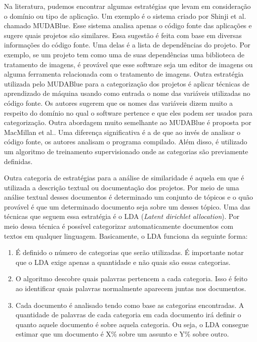 Na literatura, pudemos encontrar algumas estratégias que levam em consideração o domínio ou tipo de aplicação. Um exemplo é o sistema criado por Shinji et al. chamado MUDABlue\cite{kawaguchi2006mudablue}. Esse sistema analisa apenas o código fonte das aplicações e sugere quais projetos são similares. Essa sugestão é feita com base em diversas informações do código fonte. Uma delas é a lista de dependências do projeto. Por exemplo, se um projeto tem como uma de suas dependências uma biblioteca de tratamento de imagens, é provável que esse software seja um editor de imagens ou alguma ferramenta relacionada com o tratamento de imagens. Outra estratégia utilizada pelo MUDABlue para a categorização dos projetos é aplicar técnicas de aprendizado de máquina usando como entrada o nome das variáveis utilizadas no código fonte. Os autores sugerem que os nomes das variáveis dizem muito a respeito do domínio no qual o software pertence e que eles podem ser usados para categorização. Outra abordagem muito semelhante ao MUDABlue é proposta por  MacMillan et al.\cite{mcmillan2011categorizing}. Uma diferença significativa é a de que ao invés de analisar o código fonte, os autores analisam o programa compilado. Além disso, é utilizado um algoritmo de treinamento supervisionado onde as categorias são previamente definidas. 

Outra categoria de estratégias para a análise de similaridade é aquela em que é utilizada a descrição textual ou documentação dos projetos. Por meio de uma análise textual desses documentos é determinado um conjunto de tópicos e o quão provável é que um determinado documento seja sobre um desses tópico. Uma das técnicas que seguem essa estratégia é o LDA (\textit{Latent dirichlet allocation})\cite{blei2002latent}. Por meio dessa técnica é possível categorizar automaticamente documentos com textos em qualquer linguagem. Basicamente, o LDA funciona da seguinte forma:

\begin{enumerate}
\item É definido o número de categorias que serão utilizadas. É importante notar que o LDA exige apenas a quantidade e não quais são essas categorias.
\item O algoritmo descobre quais palavras pertencem a cada categoria. Isso é feito ao identificar quais palavras normalmente aparecem juntas nos documentos.
\item Cada documento é analisado tendo como base as categorias encontradas. A quantidade de palavras de cada categoria em cada documento irá  definir o quanto aquele documento é sobre aquela categoria. Ou seja, o LDA consegue estimar que um documento é X\% sobre um assunto e Y\% sobre outro.
\end{enumerate}


